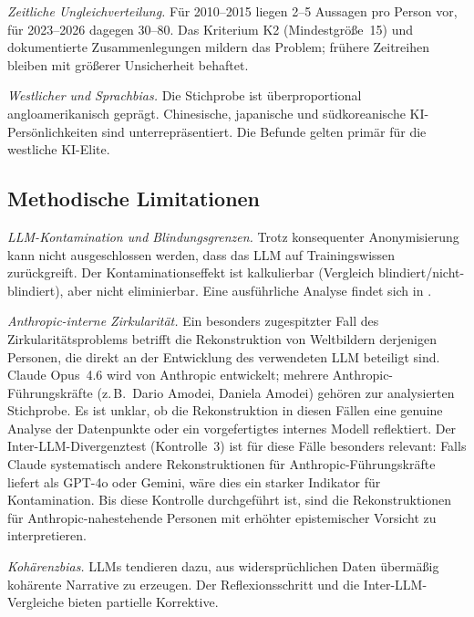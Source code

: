 \documentclass[12pt,a4paper]{article}
\begin{document}
\emph{Zeitliche Ungleichverteilung.} F\"ur 2010--2015 liegen 2--5 Aussagen pro Person vor, f\"ur 2023--2026 dagegen 30--80. Das Kriterium K2 (Mindestgr\"o\ss{}e~15) und dokumentierte Zusammenlegungen mildern das Problem; fr\"uhere Zeitreihen bleiben mit gr\"o\ss{}erer Unsicherheit behaftet.

\emph{Westlicher und Sprachbias.} Die Stichprobe ist \"uberproportional angloamerikanisch gepr\"agt. Chinesische, japanische und s\"udkoreanische KI-Pers\"onlichkeiten sind unterrepr\"asentiert. Die Befunde gelten prim\"ar f\"ur die westliche KI-Elite.


\subsection{Methodische Limitationen}

\emph{LLM-Kontamination und Blindungsgrenzen.} Trotz konsequenter Anonymisierung kann nicht ausgeschlossen werden, dass das LLM auf Trainingswissen zur\"uckgreift. Der Kontaminationseffekt ist kalkulierbar (Vergleich blindiert/nicht-blindiert), aber nicht eliminierbar. Eine ausf\"uhrliche Analyse findet sich in \citet{Geiger2026SWR}.

\emph{Anthropic-interne Zirkularit\"at.} Ein besonders zugespitzter Fall des Zirkularit\"atsproblems betrifft die Rekonstruktion von Weltbildern derjenigen Personen, die direkt an der Entwicklung des verwendeten LLM beteiligt sind. Claude Opus~4.6 wird von Anthropic entwickelt; mehrere Anthropic-F\"uhrungskr\"afte (z.\,B.\ Dario Amodei, Daniela Amodei) geh\"oren zur analysierten Stichprobe. Es ist unklar, ob die Rekonstruktion in diesen F\"allen eine genuine Analyse der Datenpunkte oder ein vorgefertigtes internes Modell reflektiert. Der Inter-LLM-Divergenztest (Kontrolle~3) ist f\"ur diese F\"alle besonders relevant: Falls Claude systematisch andere Rekonstruktionen f\"ur Anthropic-F\"uhrungskr\"afte liefert als GPT-4o oder Gemini, w\"are dies ein starker Indikator f\"ur Kontamination. Bis diese Kontrolle durchgef\"uhrt ist, sind die Rekonstruktionen f\"ur Anthropic-nahestehende Personen mit erh\"ohter epistemischer Vorsicht zu interpretieren.

\emph{Koh\"arenzbias.} LLMs tendieren dazu, aus widerspr\"uchlichen Daten \"uberm\"a\ss{}ig koh\"arente Narrative zu erzeugen. Der Reflexionsschritt und die Inter-LLM-Vergleiche bieten partielle Korrektive.
\end{document}
